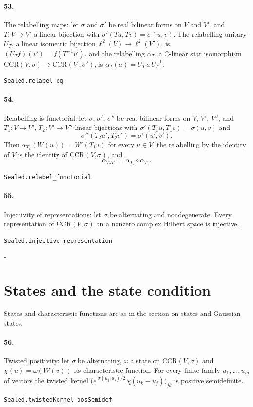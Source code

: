 \documentclass[11pt]{article}
\makeatletter
\newcommand{\keepspace}[1]{\par\penalty-100\begingroup\setlength{\dimen@}{#1}\dimen@ii\pagegoal\advance\dimen@ii-\pagetotal\ifdim\dimen@>\dimen@ii\ifdim\dimen@ii>\z@\vfil\fi\break\fi\endgroup}
\makeatother
\begin{document}
\paragraph{53.} The relabelling maps: let $\sigma$ and $\sigma'$ be real bilinear forms on $V$ and $V'$, and $T : V \to V'$ a linear bijection with $\sigma'(Tu, Tv) = \sigma(u, v)$. The relabelling unitary $U_T$, a linear isometric bijection $\ell^2(V) \to \ell^2(V')$, is $(U_T f)(v') = f(T^{-1}v')$, and the relabelling $\alpha_T$, a $\mathbb C$-linear star isomorphism $\mathrm{CCR}(V, \sigma) \to \mathrm{CCR}(V', \sigma')$, is $\alpha_T(a) = U_T\, a\, U_T^{-1}$.\par{\footnotesize\texttt{Sealed.relabel\_eq}}

\paragraph{54.} Relabelling is functorial: let $\sigma$, $\sigma'$, $\sigma''$ be real bilinear forms on $V$, $V'$, $V''$, and $T_1 : V \to V'$, $T_2 : V' \to V''$ linear bijections with $\sigma'(T_1u, T_1v) = \sigma(u, v)$ and \[\sigma''(T_2u', T_2v') = \sigma'(u', v').\] Then $\alpha_{T_1}(W(u)) = W'(T_1u)$ for every $u \in V$, the relabelling by the identity of $V$ is the identity of $\mathrm{CCR}(V, \sigma)$, and \[\alpha_{T_2 T_1} = \alpha_{T_2} \circ \alpha_{T_1}.\]\par{\footnotesize\texttt{Sealed.relabel\_functorial}}

\paragraph{55.} Injectivity of representations: let $\sigma$ be alternating and nondegenerate. Every representation of $\mathrm{CCR}(V, \sigma)$ on a nonzero complex Hilbert space is injective.\par{\footnotesize\texttt{Sealed.injective\_representation}}

\keepspace{14\baselineskip}\section*{States and the state condition}
States and characteristic functions are as in the section on states and Gaussian states.

\paragraph{56.} Twisted positivity: let $\sigma$ be alternating, $\omega$ a state on $\mathrm{CCR}(V, \sigma)$ and $\chi(u) = \omega(W(u))$ its characteristic function. For every finite family $u_1, \dots, u_m$ of vectors the twisted kernel $\big(e^{i\sigma(u_j, u_k)/2}\, \chi(u_k - u_j)\big)_{jk}$ is positive semidefinite.\par{\footnotesize\texttt{Sealed.twistedKernel\_posSemidef}}
\end{document}
